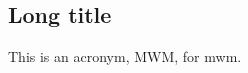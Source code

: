 \begin{refsection} %
\chapter[Short title]{Long title}

This is an acronym, MWM, for \acrfull{mwm}.

\printbibliography[heading=subbibliography, title={References}] %
\end{refsection}